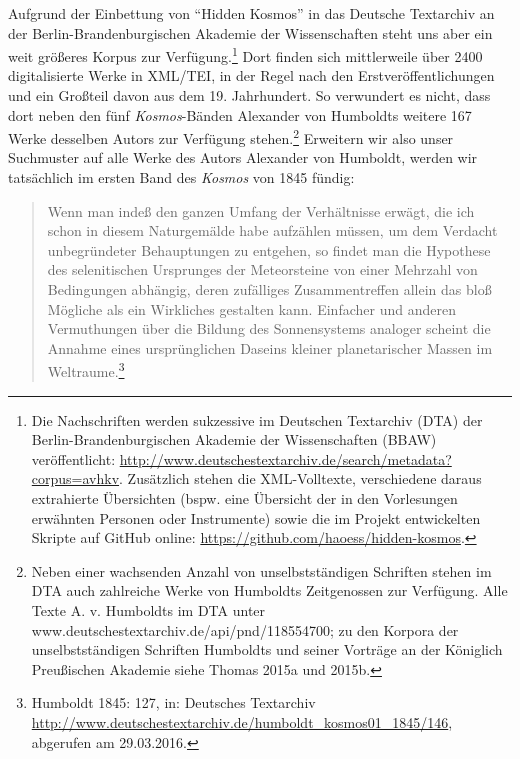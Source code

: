 Aufgrund der Einbettung von \enquote{Hidden Kosmos} in das Deutsche
Textarchiv an der Berlin-Brandenburgischen Akademie der Wissenschaften
steht uns aber ein weit größeres Korpus zur Verfügung.\footnote{Die
  Nachschriften werden sukzessive im Deutschen Textarchiv (DTA) der
  Berlin-Brandenburgischen Akademie der Wissenschaften (BBAW)
  veröffentlicht:
  \url{http://www.deutschestextarchiv.de/search/metadata?corpus=avhkv}.
  Zusätzlich stehen die XML-Volltexte, verschiedene daraus extrahierte
  Übersichten (bspw. eine Übersicht der in den Vorlesungen erwähnten
  Personen oder Instrumente) sowie die im Projekt entwickelten Skripte
  auf GitHub online: \url{https://github.com/haoess/hidden-kosmos}.}
Dort finden sich mittlerweile über 2400 digitalisierte Werke in XML/TEI,
in der Regel nach den Erstveröffentlichungen und ein Großteil davon aus
dem 19. Jahrhundert. So verwundert es nicht, dass dort neben den fünf
\emph{Kosmos}-Bänden Alexander von Humboldts weitere 167 Werke desselben
Autors zur Verfügung stehen.\footnote{Neben einer wachsenden Anzahl von
  unselbstständigen Schriften stehen im DTA auch zahlreiche Werke von
  Humboldts Zeitgenossen zur Verfügung. Alle Texte A. v. Humboldts im
  DTA unter www.deutschestextarchiv.de/api/pnd/118554700; zu den Korpora
  der unselbstständigen Schriften Humboldts und seiner Vorträge an der
  Königlich Preußischen Akademie siehe Thomas 2015a und 2015b.}
Erweitern wir also unser Suchmuster auf alle Werke des Autors Alexander
von Humboldt, werden wir tatsächlich im ersten Band des \emph{Kosmos}
von 1845 fündig:

\begin{quote}
Wenn man indeß den ganzen Umfang der Verhältnisse erwägt, die ich schon
in diesem Naturgemälde habe aufzählen müssen, um dem Verdacht
unbegründeter Behauptungen zu entgehen, so findet man die Hypothese des
selenitischen Ursprunges der Meteorsteine von einer Mehrzahl von
Bedingungen abhängig, deren zufälliges Zusammentreffen allein das bloß
Mögliche als ein Wirkliches gestalten kann. Einfacher und anderen
Vermuthungen über die Bildung des Sonnensystems analoger scheint die
Annahme eines ursprünglichen Daseins kleiner planetarischer Massen im
Weltraume.\footnote{Humboldt 1845: 127, in: Deutsches Textarchiv
  \url{http://www.deutschestextarchiv.de/humboldt_kosmos01_1845/146},
  abgerufen am 29.03.2016.}
\end{quote}

